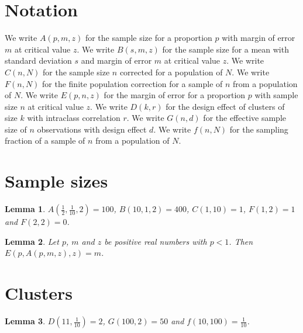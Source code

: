 \documentclass{article}
\newtheorem{lemma}{Lemma}
\begin{document}
\section{Notation}

We write $A(p,m,z)$ for the sample size for a proportion $p$ with margin of error $m$ at critical value $z$.
We write $B(s,m,z)$ for the sample size for a mean with standard deviation $s$ and margin of error $m$ at critical value $z$.
We write $C(n,N)$ for the sample size $n$ corrected for a population of $N$.
We write $F(n,N)$ for the finite population correction for a sample of $n$ from a population of $N$.
We write $E(p,n,z)$ for the margin of error for a proportion $p$ with sample size $n$ at critical value $z$.
We write $D(k,r)$ for the design effect of clusters of size $k$ with intraclass correlation $r$.
We write $G(n,d)$ for the effective sample size of $n$ observations with design effect $d$.
We write $f(n,N)$ for the sampling fraction of a sample of $n$ from a population of $N$.

\section{Sample sizes}

\begin{lemma}\label{sizes}
$A(\frac12,\frac{1}{10},2)=100$, $B(10,1,2)=400$, $C(1,10)=1$, $F(1,2)=1$ and $F(2,2)=0$.
\end{lemma}

\begin{lemma}\label{margin}
Let $p$, $m$ and $z$ be positive real numbers with $p<1$. Then $E(p,A(p,m,z),z)=m$.
\end{lemma}

\section{Clusters}

\begin{lemma}\label{clusters}
$D(11,\frac{1}{10})=2$, $G(100,2)=50$ and $f(10,100)=\frac{1}{10}$.
\end{lemma}
\end{document}
